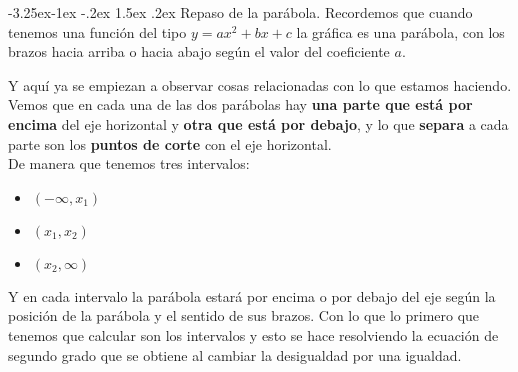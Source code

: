\documentclass[a4paper,11pt,answers]{exam}
\makeatletter
\renewcommand\paragraph{\@startsection{paragraph}{4}{\z@}%
                                     {-3.25ex\@plus -1ex \@minus -.2ex}%
                                     {1.5ex \@plus .2ex}%
                                     {\normalfont\normalsize\bfseries}}
\makeatother
\begin{document}
\paragraph{Repaso de la parábola.}
Recordemos que cuando tenemos una función del tipo $y = ax^2 + bx + c$ la gráfica es una parábola,
con los brazos hacia arriba o hacia abajo según el valor del coeficiente $a$.
\begin{center}
  \quad\quad\quad
\end{center}
Y aquí ya se empiezan a observar cosas relacionadas con lo que estamos haciendo.\\
Vemos que en cada una de las dos parábolas hay \textbf{una parte que está por encima} del eje
horizontal y \textbf{otra que está por debajo}, y lo que \textbf{separa} a cada parte son los
\textbf{puntos de corte} con el eje horizontal.\\
De manera que tenemos tres intervalos:
\begin{itemize}
\item $(-\infty, x_1)$
\item $(x_1, x_2)$
\item $(x_2, \infty)$
\end{itemize}
Y en cada intervalo la parábola estará por encima o por debajo del eje según la posición de la
parábola y el sentido de sus brazos.
Con lo que lo primero que tenemos que calcular son los intervalos y esto se hace resolviendo la
ecuación de segundo grado que se obtiene al cambiar la desigualdad por una igualdad.\\
\end{document}
